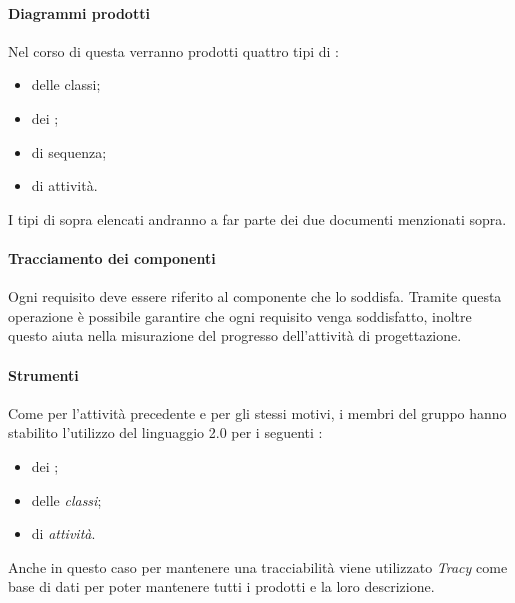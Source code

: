                         \paragraph*{Diagrammi prodotti}
                        Nel corso di questa  verranno prodotti quattro tipi di  :
                        \begin{itemize}
                        \item {} delle classi;
                        \item {} dei ;
                        \item {} di sequenza;
                        \item {} di attivit\`a.
                        \end{itemize}
                        I tipi di  sopra elencati andranno a far parte dei due documenti menzionati sopra.
		
			\paragraph*{Tracciamento dei componenti}
			Ogni requisito deve essere riferito al componente che lo soddisfa. Tramite questa operazione è possibile garantire che ogni requisito venga
			soddisfatto, inoltre questo aiuta nella misurazione del progresso dell'attività di progettazione.		
			
		        \paragraph*{Strumenti}
		        Come per l'attivit\`a precedente e per gli stessi motivi, i membri del gruppo hanno stabilito l'utilizzo del linguaggio  2.0 per i seguenti
		        :
		        \begin{itemize}
			\item {} dei ; 
			\item {} delle \textit{classi};	
			\item {} di \textit{attivit\`a}.
		        \end{itemize}
                        Anche in questo caso per mantenere una tracciabilità viene utilizzato \textit{Tracy} come base di dati per poter mantenere tutti i  prodotti e la loro descrizione.
			 
